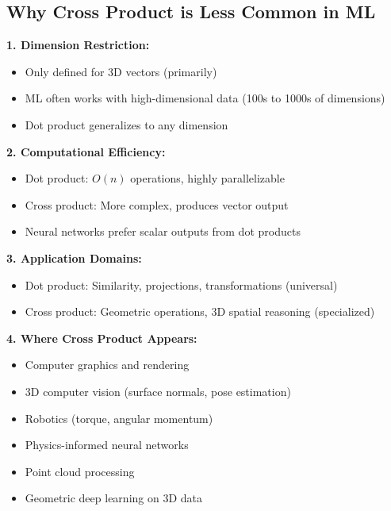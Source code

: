 \documentclass[12pt,a4paper]{article}
\theoremstyle{definition}
\begin{document}
\subsection{Why Cross Product is Less Common in ML}

\begin{tcolorbox}[enhanced,breakable,colback=yellow!10!white,colframe=orange!75!black,title=Limitations of Cross Product in ML]

\textbf{1. Dimension Restriction:}
\begin{itemize}
    \item Only defined for 3D vectors (primarily)
    \item ML often works with high-dimensional data (100s to 1000s of dimensions)
    \item Dot product generalizes to any dimension
\end{itemize}

\textbf{2. Computational Efficiency:}
\begin{itemize}
    \item Dot product: $O(n)$ operations, highly parallelizable
    \item Cross product: More complex, produces vector output
    \item Neural networks prefer scalar outputs from dot products
\end{itemize}

\textbf{3. Application Domains:}
\begin{itemize}
    \item Dot product: Similarity, projections, transformations (universal)
    \item Cross product: Geometric operations, 3D spatial reasoning (specialized)
\end{itemize}

\textbf{4. Where Cross Product Appears:}
\begin{itemize}
    \item Computer graphics and rendering
    \item 3D computer vision (surface normals, pose estimation)
    \item Robotics (torque, angular momentum)
    \item Physics-informed neural networks
    \item Point cloud processing
    \item Geometric deep learning on 3D data
\end{itemize}
\end{tcolorbox}
\end{document}
